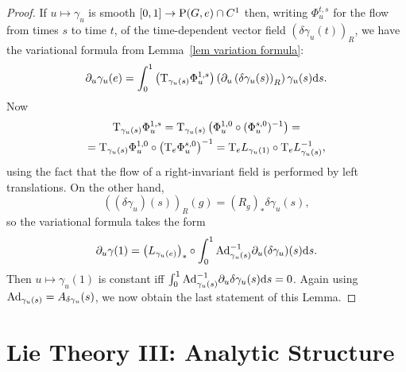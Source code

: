 \begin{proof}
    If $u\mapsto \gamma_u$ is smooth $[0,1]\to \mathrm{P}(G,e)\cap C^1$ then, writing $\Phi^{t,s}_u$ for the flow from times $s$ to time $t$, of the time-dependent vector field $(\delta\gamma_u(t))_R$, we have the variational formula from Lemma~\ref{lem variation formula}:
    \[\partial_u\gamma_u(e)=\int_0^1 \left(\mathrm{T}_{\gamma_u(s)}\Phi^{1,s}_u\right)\left(\partial_u \left(\delta\gamma_u(s)\right)_R\right)\gamma_u(s){\mathrm{d}} s.\]
    Now 
    \begin{multline}
        \mathrm{T}_{\gamma_u(s)}\Phi^{1,s}_u=\mathrm{T}_{\gamma_u(s)}\left(\Phi_u^{1,0}\circ (\Phi^{s,0}_u)^{-1}\right)=\\=\mathrm{T}_{\gamma_u(s)}\Phi_u^{1,0}\circ \left(\mathrm{T}_e\Phi^{s,0}_u\right)^{-1}= \mathrm{T}_{e}L_{\gamma_u(1)}\circ \mathrm{T}_e L_{\gamma_u(s)}^{-1},
    \end{multline}
    using the fact that the flow of a right-invariant field is performed by left translations.  On the other hand,
    \[((\delta \gamma_u)(s))_R(g)=\left(R_g\right)_\ast \delta\gamma_u(s),\]
    so the variational formula takes the form
    \[\partial_u\gamma(1)=\left(L_{\gamma_u(e)}\right)_\ast\circ\int_0^1 \mathrm{Ad}_{\gamma_u(s)}^{-1}\partial_u(\delta\gamma_u)(s){\mathrm{d}} s.\]
    Then $u\mapsto\gamma_u(1)$ is constant iff $\int_0^1\mathrm{Ad}_{\gamma_u(s)}^{-1}\partial_u\delta\gamma_u(s){\mathrm{d}} s=0$. Again using $\mathrm{Ad}_{\gamma_u(s)}=A_{\delta \gamma_u}(s)$, we now obtain the last statement of this Lemma.
\end{proof}















\clearpage
\section{Lie Theory III: Analytic Structure}\label{sec: Lie theory iii}

